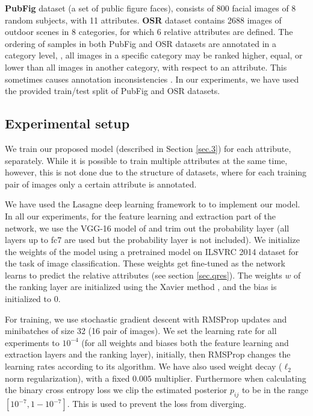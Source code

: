 \textbf{PubFig} \cite{parikh2011} dataset (a set of public figure faces), consists of 800 facial images of 8 random subjects, with 11 attributes.
\textbf{OSR} \cite{parikh2011} dataset contains 2688 images of outdoor scenes in 8 categories, for which 6 relative attributes are defined.
The ordering of samples in both PubFig and OSR datasets are annotated in a category level, \ie, all images in a specific category may be ranked higher, equal, or lower than all images in another category, with respect to an attribute. This sometimes causes annotation inconsistencies \cite{Sandeep_2014_CVPR}.
In our experiments, we have used the provided train/test split of PubFig and OSR datasets.


\subsection{Experimental setup}
We train our proposed model (described in Section \ref{sec.3}) for each attribute, separately. While it is possible  to train multiple attributes at the same time, however, this is not done due to the structure of datasets, where for each training pair of images only a certain attribute is annotated.

We have used the Lasagne \cite{lasagne} deep learning framework to to implement our model.
In all our experiments, for the feature learning and extraction part of the network,
we use the VGG-16 model of \cite{verydeep} and trim out the probability layer (all layers up to fc7 are used but the probability layer is not included).
We initialize the weights of the model using a pretrained model on ILSVRC 2014 dataset \cite{ilsvrc2014} for the task of image classification. These weights get fine-tuned as the network learns to predict the relative attributes (see section \ref{sec.qres}). The weights $w$ of the ranking layer are initialized using the Xavier method \cite{glorot}, and the bias is initialized to 0.

For training, we use stochastic gradient descent with RMSProp \cite{Tieleman2012} updates and minibatches of size 32 (16 pair of images).
We set the learning rate for all experiments to $10^{-4}$ (for all weights and biases both the feature learning and extraction layers and the ranking layer), initially, then RMSProp changes the learning rates according to its algorithm. We have also used weight decay ($\ell_2$ norm regularization), with a fixed $0.005$ multiplier. Furthermore when calculating the binary cross entropy loss we clip the estimated posterior $p_{ij}$ to be in the range $[10^{-7}, 1 - 10^{-7}]$. This is used to prevent the loss from diverging.

